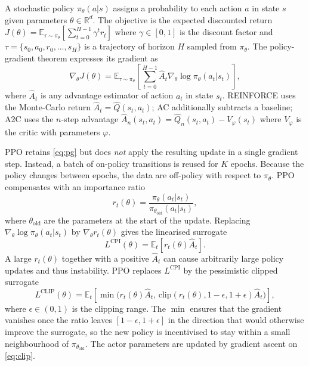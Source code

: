 \documentclass{article}
\theoremstyle{plain}
\theoremstyle{definition}
\theoremstyle{remark}
\begin{document}
A stochastic policy $\pi_\theta(a|s)$ assigns a probability to each action $a$ in state $s$ given parameters $\theta\in\mathbb{R}^{d}$. The objective is the expected discounted return $J(\theta)=\mathbb{E}_{\tau\sim\pi_\theta}\!\left[\sum_{t=0}^{H-1}\gamma^t r_t\right]$ where $\gamma\in[0,1]$ is the discount factor and $\tau=\{s_0,a_0,r_0,\dots,s_H\}$ is a trajectory of horizon $H$ sampled from $\pi_\theta$. The policy-gradient theorem expresses its gradient as
\begin{equation}
    \nabla_\theta J(\theta) = \mathbb{E}_{\tau\sim\pi_\theta}\!\left[\sum_{t=0}^{H-1} \hat A_t \nabla_\theta \log\pi_\theta(a_t|s_t)\right],
    \label{eq:pg}
\end{equation}
where $\hat A_t$ is any advantage estimator of action $a_t$ in state $s_t$. REINFORCE uses the Monte-Carlo return $\hat A_t=\hat Q(s_t,a_t)$; AC additionally subtracts a baseline; A2C uses the $n$-step advantage $\hat A_n(s_t,a_t)=\hat Q_n(s_t,a_t)-V_\varphi(s_t)$ where $V_\varphi$ is the critic with parameters $\varphi$.

PPO retains \cref{eq:pg} but does \emph{not} apply the resulting update in a single gradient step. Instead, a batch of on-policy transitions is reused for $K$ epochs. Because the policy changes between epochs, the data are off-policy with respect to $\pi_\theta$. PPO compensates with an importance ratio
\begin{equation}
    r_t(\theta) = \frac{\pi_\theta(a_t|s_t)}{\pi_{\theta_{\mathrm{old}}}(a_t|s_t)},
    \label{eq:ratio}
\end{equation}
where $\theta_{\mathrm{old}}$ are the parameters at the start of the update. Replacing $\nabla_\theta\log\pi_\theta(a_t|s_t)$ by $\nabla_\theta r_t(\theta)$ gives the linearised surrogate
\begin{equation}
    L^{\mathrm{CPI}}(\theta) = \mathbb{E}_t\!\left[r_t(\theta)\hat A_t\right].
    \label{eq:cpi}
\end{equation}
A large $r_t(\theta)$ together with a positive $\hat A_t$ can cause arbitrarily large policy updates and thus instability. PPO replaces $L^{\mathrm{CPI}}$ by the pessimistic clipped surrogate
\begin{equation}
    \!L^{\mathrm{CLIP}}\!(\theta)\! =\! \mathbb{E}_t\!\left[\min\!\big(r_t(\theta)\hat A_t,\,\mathrm{clip}(r_t(\theta),1\!-\!\epsilon,1\!+\!\epsilon)\hat A_t\big)\right]\!\!,
    \label{eq:clip}
\end{equation}
where $\epsilon\in(0,1)$ is the clipping range. The $\min$ ensures that the gradient vanishes once the ratio leaves $[1-\epsilon,1+\epsilon]$ in the direction that would otherwise improve the surrogate, so the new policy is incentivised to stay within a small neighbourhood of $\pi_{\theta_{\mathrm{old}}}$. The actor parameters are updated by gradient ascent on \cref{eq:clip}.
\end{document}
